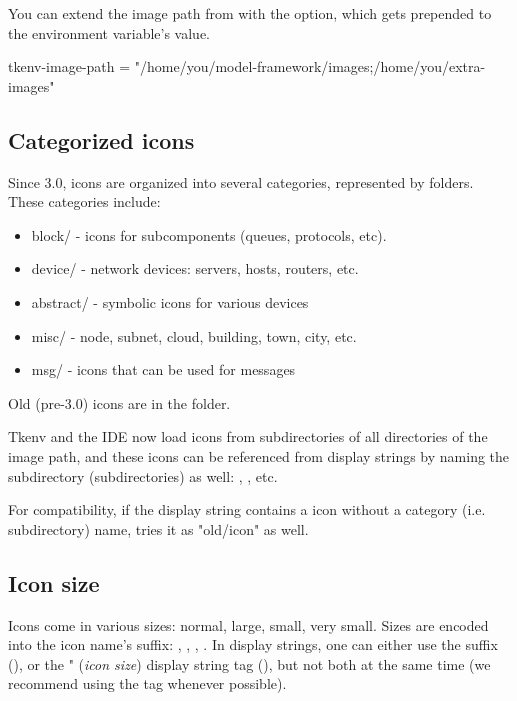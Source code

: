 You can extend the image path from  with the
 option, which gets prepended to the environment
variable's value.

\begin{inifile}
[General]
tkenv-image-path = "/home/you/model-framework/images;/home/you/extra-images"
\end{inifile}


\subsection{Categorized icons}

Since {\opp} 3.0, icons are organized into several categories, represented
by folders. These categories include:

\begin{itemize}
  \item block/ - icons for subcomponents (queues, protocols, etc).
  \item device/ - network devices: servers, hosts, routers, etc.
  \item abstract/ - symbolic icons for various devices
  \item misc/ - node, subnet, cloud, building, town, city, etc.
  \item msg/ - icons that can be used for messages
\end{itemize}

Old (pre-3.0) icons are in the  folder.

Tkenv and the IDE now load icons from subdirectories of all directories
of the image path, and these icons can be referenced from display strings
by naming the subdirectory (subdirectories) as well:
, , etc.

For compatibility, if the display string contains a icon without
a category (i.e. subdirectory) name, {\opp} tries it as "old/icon" as well.

\subsection{Icon size}

Icons come in various sizes: normal, large, small, very small. Sizes are
encoded into the icon name's suffix: , , , .
In display strings, one can either use the suffix (),
or the " (\textit{icon size}) display string tag (),
but not both at the same time (we recommend using the  tag whenever possible).


